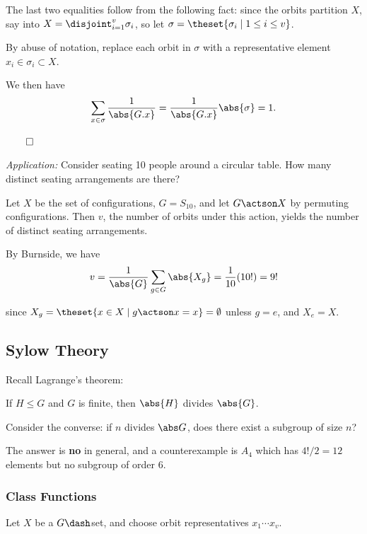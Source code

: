The last two equalities follow from the following fact: since the orbits
partition \(X\), say into
\(X = \displaystyle\disjoint_{i=1}^v \sigma_i\), so let
\(\sigma = \theset{\sigma_i \mid 1 \leq i \leq v}\).

By abuse of notation, replace each orbit in \(\sigma\) with a
representative element \(x_i\in \sigma_i \subset X\).

We then have
\begin{align*}
\sum_{x \in \sigma} \frac{1}{\abs{G.x}} = \frac{1}{\abs{G.x}} \abs{\sigma}  = 1.
\end{align*}

\(\qed\)

\emph{Application:} Consider seating 10 people around a circular table.
How many distinct seating arrangements are there?

Let \(X\) be the set of configurations, \(G = S_{10}\), and let
\(G\actson X\) by permuting configurations. Then \(v\), the number of
orbits under this action, yields the number of distinct seating
arrangements.

By Burnside, we have
\begin{align*}
v = \frac{1}{\abs{G}} \sum_{g\in G} \abs{X_g} = \frac{1}{10} (10!) = 9!
\end{align*}

since \(X_g = \theset{x\in X \mid g\actson x = x} = \emptyset\) unless
\(g = e\), and \(X_e = X\).

\hypertarget{sylow-theory}{%
\subsection{Sylow Theory}\label{sylow-theory}}

Recall Lagrange's theorem:

If \(H \leq G\) and \(G\) is finite, then \(\abs{H}\) divides
\(\abs{G}\).

Consider the converse: if \(n\) divides \(\abs G\), does there exist a
subgroup of size \(n\)?

The answer is \textbf{no} in general, and a counterexample is \(A_4\)
which has \(4!/2 = 12\) elements but no subgroup of order 6.

\hypertarget{class-functions}{%
\subsubsection{Class Functions}\label{class-functions}}

Let \(X\) be a \(G\dash\)set, and choose orbit representatives
\(x_1 \cdots x_v\).

